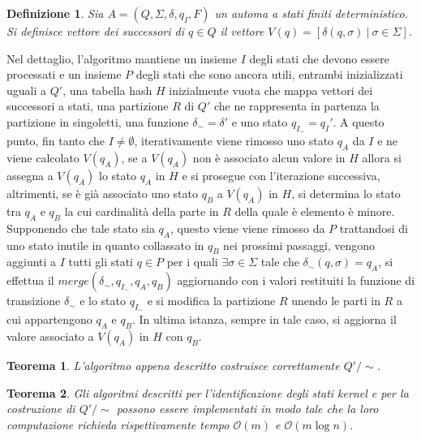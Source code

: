 \documentclass[a4paper,12pt,twoside, openright]{report} %
\newcommand{\partitioned}[2]{#1\slash\!\!#2}  %
\newcommand{\bigo}[0]{\mathcal{O}}            %
\newtheorem{theorem}{Teorema}[chapter]        %
\newtheorem{definition}{Definizione}[chapter] %
\begin{document}
\begin{definition}
  Sia $A = (Q, \Sigma, \delta, q_I, F)$ un automa a stati finiti deterministico. Si definisce
  \emph{vettore dei successori} di $q \in Q$ il vettore $V(q) = [\delta(q, \sigma) \ | \ \sigma \in \Sigma]$.
\end{definition}

Nel dettaglio, l'algoritmo mantiene un insieme $I$ degli stati che devono essere processati e 
un insieme $P$ degli stati che sono ancora utili, entrambi inizializzati uguali a $Q'$,
una tabella hash $H$ inizialmente vuota che mappa vettori dei successori a stati,
una partizione $R$ di $Q'$ che ne rappresenta in partenza la partizione in singoletti, 
una funzione $\delta_\sim = \delta'$ e uno stato $q_{I_\sim} = q_I'$. 
A questo punto, fin tanto che $I \neq \emptyset$, iterativamente viene rimosso uno stato $q_A$ da $I$ e ne viene
calcolato $V(q_A)$, se a $V(q_A)$ non è associato alcun valore in $H$ allora si assegna a $V(q_A)$ lo stato $q_A$ in
$H$ e si prosegue con l'iterazione successiva, altrimenti, se è già associato uno stato $q_B$ a $V(q_A)$ in $H$, 
si determina lo stato tra $q_A$ e $q_B$ la cui cardinalità della parte in $R$ della quale è elemento è minore.
Supponendo che tale stato sia $q_A$, questo viene viene rimosso da $P$ trattandosi di uno stato inutile
in quanto collassato in $q_B$ nei prossimi passaggi, 
vengono aggiunti a $I$ tutti gli stati $q \in P$ per i quali $\exists \sigma \in \Sigma$ tale che
$\delta_\sim(q, \sigma) = q_A$, si effettua il $merge(\delta_\sim, q_{I_\sim}, q_A, q_B)$ aggiornando
con i valori restituiti la funzione di transizione $\delta_\sim$ e lo stato $q_{I_\sim}$ e 
si modifica la partizione $R$ unendo le parti in $R$ a cui appartengono $q_A$ e $q_B$. In ultima istanza, 
sempre in tale caso, si aggiorna il valore associato a $V(q_A)$ in $H$ con $q_B$.

\begin{theorem}\label{th:aeq-correctness}
  L'algoritmo appena descritto costruisce correttamente $\partitioned{Q'}{\sim}$.
\end{theorem}

\begin{theorem}
  \label{th:hm-complexity}
  Gli algoritmi descritti per l'identificazione degli stati kernel e per la costruzione di
  $\partitioned{Q'}{\sim}$ possono essere implementati in modo tale che la loro computazione richieda rispettivamente
  tempo $\bigo(m)$ e $\bigo(m \log n)$.
\end{theorem}
\end{document}
